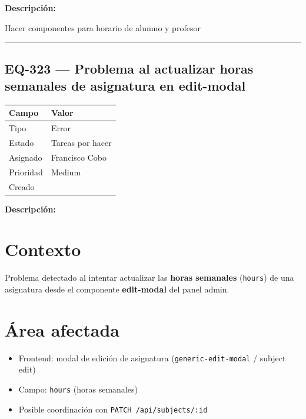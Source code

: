 \documentclass[
  spanish,
  11pt,
]{report}
\newcounter{none} %
\providecommand{\tightlist}{%
  \setlength{\itemsep}{0pt}\setlength{\parskip}{0pt}}
\begin{document}
\textbf{Descripción:}

Hacer componentes para horario de alumno y profesor

\begin{center}\rule{0.5\linewidth}{0.5pt}\end{center}

\subsection{EQ-323 --- Problema al actualizar horas semanales de
asignatura en
edit-modal}\label{eq-323-problema-al-actualizar-horas-semanales-de-asignatura-en-edit-modal}

{\def\LTcaptype{none} %
\begin{longtable}[]{@{}ll@{}}
\toprule\noalign{}
Campo & Valor \\
\midrule\noalign{}
\endhead
\bottomrule\noalign{}
\endlastfoot
Tipo & Error \\
Estado & Tareas por hacer \\
Asignado & Francisco Cobo \\
Prioridad & Medium \\
Creado & \\
\end{longtable}
}

\textbf{Descripción:}

\section{Contexto}\label{contexto}

Problema detectado al intentar actualizar las \textbf{horas semanales}
(\texttt{hours}) de una asignatura desde el componente
\textbf{edit-modal} del panel admin.

\section{Área afectada}\label{uxe1rea-afectada}

\begin{itemize}
\tightlist
\item
  Frontend: modal de edición de asignatura (\texttt{generic-edit-modal}
  / subject edit)
\item
  Campo: \texttt{hours} (horas semanales)
\item
  Posible coordinación con \texttt{PATCH\ /api/subjects/:id}
\end{itemize}
\end{document}
